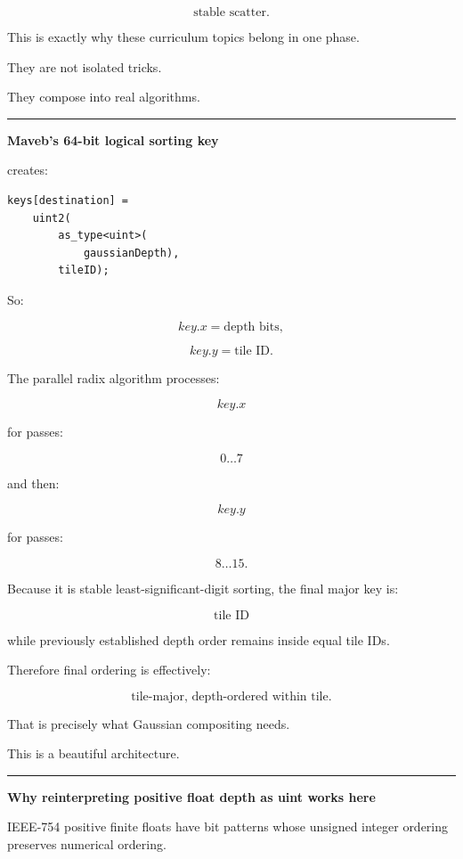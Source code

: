 \[
\text{stable scatter}.
\]

This is exactly why these curriculum topics belong in one phase.

They are not isolated tricks.

They compose into real algorithms.

\begin{center}\rule{0.5\linewidth}{0.5pt}\end{center}

\textbf{Maveb's 64-bit logical sorting key}

 creates:

\protect{}\label{e9dtbb}%
\begin{verbatim}
keys[destination] =
    uint2(
        as_type<uint>(
            gaussianDepth),
        tileID);
\end{verbatim}

So:

\[
key.x=\text{depth bits},
\]

\[
key.y=\text{tile ID}.
\]

The parallel radix algorithm processes:

\[
key.x
\]

for passes:

\[
0\dots7
\]

and then:

\[
key.y
\]

for passes:

\[
8\dots15.
\]

Because it is stable least-significant-digit sorting, the final major key is:

\[
\boxed{\text{tile ID}}
\]

while previously established depth order remains inside equal tile IDs.

Therefore final ordering is effectively:

\[
\boxed{
\text{tile-major, depth-ordered within tile}.
}
\]

That is precisely what Gaussian compositing needs.

This is a beautiful architecture.

\begin{center}\rule{0.5\linewidth}{0.5pt}\end{center}

\textbf{Why reinterpreting positive float depth as uint works here}

IEEE-754 positive finite floats have bit patterns whose unsigned integer ordering preserves numerical ordering.

